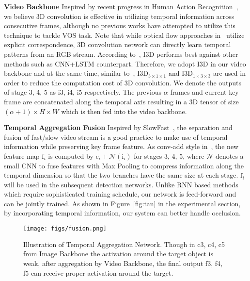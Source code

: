 \documentclass[10pt,twocolumn,letterpaper]{article}
\begin{document}
\textbf{Video Backbone}
Inspired by recent progress in Human Action Recognition~\cite{carreira2017i3d, wang2018nonlocal, feichtenhofer2018slowfast},
we believe 3D convolution is effective in utilizing temporal information across consecutive frames,
although no previous works have attempted to utilize this technique to tackle VOS task.
Note that while optical flow approaches in~\cite{luiten2018premvos,xiao2018jointreid} utilize explicit correspondence,
3D convolution network can directly learn temporal patterns from an RGB stream.
According to~\cite{carreira2017i3d}, I3D performs best against other methods such as CNN+LSTM counterpart.
Therefore, we adopt I3D in our video backbone and at the same time, similar to~\cite{wang2018nonlocal}, $\text{I3D}_{3\times1\times1}$ and $\text{I3D}_{1\times3\times3}$ are used in order to reduce the computation cost of 3D convolution.
We denote the outputs of stage 3, 4, 5 as i3, i4, i5 respectively.
The previous $\alpha$ frames and current key frame are concatenated along the temporal axis resulting in a 3D tensor of size $(\alpha + 1)\times H \times W$ which is then fed into the video backbone.

\textbf{Temporal Aggregation Fusion}
Inspired by SlowFast~\cite{feichtenhofer2018slowfast}, the separation and fusion of fast/slow video stream is a good practice to make use of  temporal information while preserving key frame feature.
As conv-add style in~\cite{feichtenhofer2018slowfast}, the new feature map $\text{f}_i$ is computed by $\text{c}_i + \mathcal{N}(\text{i}_i)$ for stages 3, 4, 5, where $\mathcal{N}$ denotes a small CNN to fuse features with Max Pooling to compress information along the temporal dimension so that the two branches have the same size at each stage.
$\text{f}_i$ will be used in the subsequent detection networks.
Unlike RNN based methods~\cite{xiao2018jointreid, sadeghian2017tracking} which require sophisticated training schedule, our network is feed-forward and can be jointly trained.
As shown in Figure~\ref{fig:tan} in the experimental section, by incorporating temporal information, our system can better handle occlusion.
\begin{figure}[]
\begin{center}
   \texttt{[image: figs/fusion.png]}
\end{center}
\caption{Illustration of Temporal Aggregation Network. Though in c3, c4, c5 from Image Backbone the activation around the target object is weak, after aggregation by Video Backbone, the final output f3, f4, f5 can receive proper activation around the target.}
    \vspace*{-5pt}
\label{fig:fusion}
\end{figure}
\end{document}
